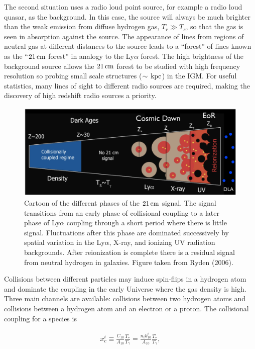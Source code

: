 \documentclass[a4paper,11pt]{article}
\begin{document}
{\noindent}The second situation uses a radio loud point source, for example a radio loud quasar, as the background. In this case, the source will always be much brighter than the weak emission from diffuse hydrogen gas, $T_r\gg T_s$, so that the gas is seen in absorption against the source. The appearance of lines from regions of neutral gas at different distances to the source leads to a ``forest'' of lines known as the ``$21\,{\rm cm}$ forest'' in analogy to the Ly$\alpha$ forest. The high brightness of the background source allows the $21\,{\rm cm}$ forest to be studied with high frequency resolution so probing small scale structures ($\sim\,{\rm kpc}$) in the IGM. For useful statistics, many lines of sight to different radio sources are required, making the discovery of high redshift radio sources a priority.

\begin{figure}[t]
    \includegraphics[width=16cm]{figures/21cm_schematic.png}
    \centering
    \caption{\footnotesize{Cartoon of the different phases of the $21\,{\rm cm}$ signal. The signal transitions from an early phase of collisional coupling to a later phase of Ly$\alpha$ coupling through a short period where there is little signal. Fluctuations after this phase are dominated successively by spatial variation in the Ly$\alpha$, X-ray, and ionizing UV radiation backgrounds. After reionization is complete there is a residual signal from neutral hydrogen in galaxies. Figure taken from Ryden (2006).}}
    \label{fig:21cmschematic}
\end{figure}

{\noindent}Collisions between different particles may induce spin-flips in a hydrogen atom and dominate the coupling in the early Universe where the gas density is high. Three main channels are available: collisions between two hydrogen atoms and collisions between a hydrogen atom and an electron or a proton. The collisional coupling for a species is

\begin{align*}
    x_c^i \equiv \frac{C_{10}}{A_{10}}\frac{T_*}{T_\gamma} = \frac{n_ik_{10}^i}{A_{10}}\frac{T_*}{T_\gamma},
\end{align*}
\end{document}
